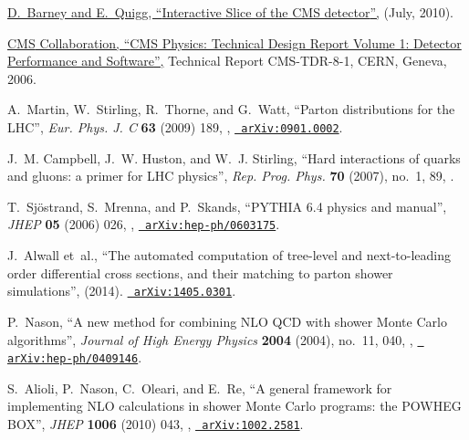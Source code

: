 \documentclass[12pt]{thesis}  %
\begin{document}
\begin{thebibliography}{100}
\href {https://cms-docdb.cern.ch/cgi-bin/PublicDocDB/ShowDocument?docid=4172}
  {D.~Barney and E.~Quigg, ``{Interactive Slice of the CMS detector}'',} (July,
  2010).

\href {https://cds.cern.ch/record/922757} {{ CMS} Collaboration, ``{CMS
  Physics: Technical Design Report Volume 1: Detector Performance and
  Software}'',} Technical Report CMS-TDR-8-1, CERN, Geneva, 2006.

\hrefCMSnoop {} {A.~Martin, W.~Stirling, R.~Thorne, and G.~Watt, ``Parton
  distributions for the LHC'',} \textit{ Eur. Phys. J. C} \textbf{ 63} (2009)
  189,
  \href{http://dx.doi.org/10.1140/epjc/s10052-009-1072-5}{},
  \href{http://www.arXiv.org/abs/0901.0002}{\texttt{ arXiv:0901.0002}}.

\hrefCMSnoop {} {J.~M. Campbell, J.~W. Huston, and W.~J. Stirling, ``Hard
  interactions of quarks and gluons: a primer for LHC physics'',} \textit{ Rep.
  Prog. Phys.} \textbf{ 70} (2007), no.~1, 89,
  \href{http://dx.doi.org/10.1088/0034-4885/70/1/R02}{}.

\hrefCMSnoop {} {T.~Sj{\"o}strand, S.~Mrenna, and P.~Skands, ``{PYTHIA} 6.4
  physics and manual'',} \textit{ JHEP} \textbf{ 05} (2006) 026,
  \href{http://dx.doi.org/10.1088/1126-6708/2006/05/026}{},
\href{http://www.arXiv.org/abs/hep-ph/0603175}{\texttt{ arXiv:hep-ph/0603175}}.

J.~Alwall\hrefCMSnoop {} { {et~al.}, ``The automated computation of tree-level
  and next-to-leading order differential cross sections, and their matching to
  parton shower simulations'',} (2014).
\href{http://www.arXiv.org/abs/1405.0301}{\texttt{ arXiv:1405.0301}}.

\hrefCMSnoop {} {P.~Nason, ``A new method for combining NLO QCD with shower
  Monte Carlo algorithms'',} \textit{ Journal of High Energy Physics} \textbf{
  2004} (2004), no.~11, 040,
  \href{http://dx.doi.org/10.1088/1126-6708/2004/11/040}{},
  \href{http://www.arXiv.org/abs/hep-ph/0409146}{\texttt{
  arXiv:hep-ph/0409146}}.

\hrefCMSnoop {} {S.~Alioli, P.~Nason, C.~Oleari, and E.~Re, ``{A general
  framework for implementing NLO calculations in shower Monte Carlo programs:
  the POWHEG BOX}'',} \textit{ JHEP} \textbf{ 1006} (2010) 043,
  \href{http://dx.doi.org/10.1007/JHEP06(2010)043}{},
\href{http://www.arXiv.org/abs/1002.2581}{\texttt{ arXiv:1002.2581}}.


\end{thebibliography}
\end{document}
